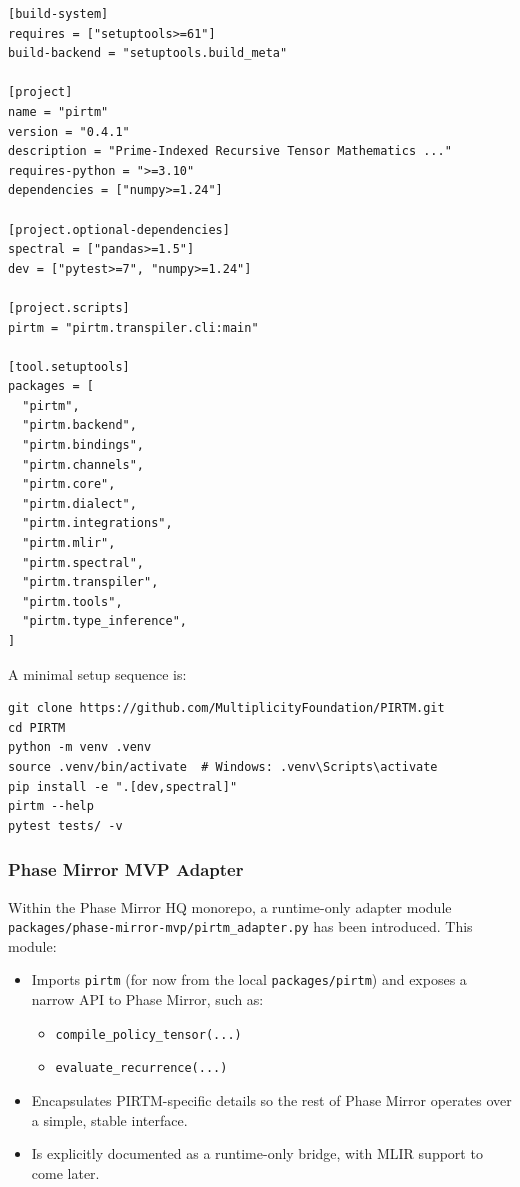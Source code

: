 \documentclass[11pt]{article}
\begin{document}
\begin{lstlisting}[style=code,language={[LaTeX]TeX}]
[build-system]
requires = ["setuptools>=61"]
build-backend = "setuptools.build_meta"

[project]
name = "pirtm"
version = "0.4.1"
description = "Prime-Indexed Recursive Tensor Mathematics ..."
requires-python = ">=3.10"
dependencies = ["numpy>=1.24"]

[project.optional-dependencies]
spectral = ["pandas>=1.5"]
dev = ["pytest>=7", "numpy>=1.24"]

[project.scripts]
pirtm = "pirtm.transpiler.cli:main"

[tool.setuptools]
packages = [
  "pirtm",
  "pirtm.backend",
  "pirtm.bindings",
  "pirtm.channels",
  "pirtm.core",
  "pirtm.dialect",
  "pirtm.integrations",
  "pirtm.mlir",
  "pirtm.spectral",
  "pirtm.transpiler",
  "pirtm.tools",
  "pirtm.type_inference",
]
\end{lstlisting}

A minimal setup sequence is:

\begin{lstlisting}[style=code]
git clone https://github.com/MultiplicityFoundation/PIRTM.git
cd PIRTM
python -m venv .venv
source .venv/bin/activate  # Windows: .venv\Scripts\activate
pip install -e ".[dev,spectral]"
pirtm --help
pytest tests/ -v
\end{lstlisting}

\subsubsection{Phase Mirror MVP Adapter}

Within the Phase Mirror HQ monorepo, a runtime-only adapter module \texttt{packages/phase-mirror-mvp/pirtm\_adapter.py} has been introduced. This module:
\begin{itemize}
  \item Imports \texttt{pirtm} (for now from the local \texttt{packages/pirtm}) and exposes a narrow API to Phase Mirror, such as:
  \begin{itemize}
    \item \verb|compile_policy_tensor(...)|
    \item \verb|evaluate_recurrence(...)|
  \end{itemize}
  \item Encapsulates PIRTM-specific details so the rest of Phase Mirror operates over a simple, stable interface.
  \item Is explicitly documented as a runtime-only bridge, with MLIR support to come later.
\end{itemize}
\end{document}

